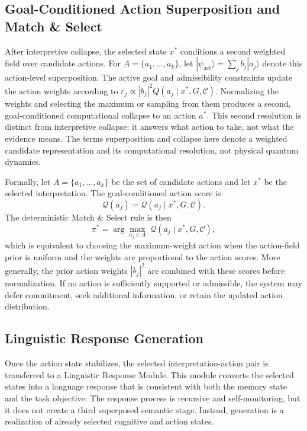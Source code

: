 \documentclass[10pt,journal,compsoc]{IEEEtran}
\begin{document}
\subsection{Goal-Conditioned Action Superposition and Match \& Select}

After interpretive collapse, the selected state $x^{\ast}$ conditions a second weighted field over candidate actions. For $A=\{a_1,\ldots,a_k\}$, let $|\psi_{\mathrm{act}}\rangle=\sum_j b_j|a_j\rangle$ denote this action-level superposition. The active goal and admissibility constraints update the action weights according to $r_j \propto |b_j|^2 Q(a_j\mid x^{\ast},G,\mathcal{C})$. Normalizing the weights and selecting the maximum or sampling from them produces a second, goal-conditioned computational collapse to an action $a^{\ast}$. This second resolution is distinct from interpretive collapse: it answers what action to take, not what the evidence means. The terms superposition and collapse here denote a weighted candidate representation and its computational resolution, not physical quantum dynamics.

Formally, let $A = \{a_1, \ldots, a_k\}$ be the set of candidate actions and let $x^{\ast}$ be the selected interpretation. The goal-conditioned action score is
\[
\mathcal{Q}(a_j) = \mathcal{Q}(a_j \mid x^{\ast}, G, \mathcal{C}).
\]
The deterministic Match \& Select rule is then
\[
\pi^{\ast} = \arg\max_{a_j \in A} \; \mathcal{Q}(a_j \mid x^{\ast}, G, \mathcal{C}),
\]
which is equivalent to choosing the maximum-weight action when the action-field prior is uniform and the weights are proportional to the action scores. More generally, the prior action weights $|b_j|^2$ are combined with these scores before normalization. If no action is sufficiently supported or admissible, the system may defer commitment, seek additional information, or retain the updated action distribution.

\subsection{Linguistic Response Generation}

Once the action state stabilizes, the selected interpretation-action pair is transferred to a Linguistic Response Module. This module converts the selected states into a language response that is consistent with both the memory state and the task objective. The response process is recursive and self-monitoring, but it does not create a third superposed semantic stage. Instead, generation is a realization of already selected cognitive and action states.
\end{document}

